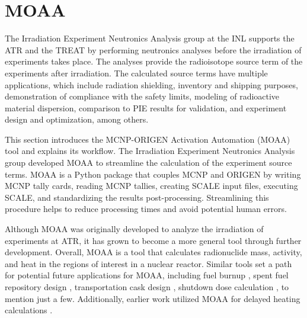 \label{ch:delayedheat}

\section{MOAA}

The Irradiation Experiment Neutronics Analysis group at the \gls*{INL} supports the \gls*{ATR} and the \gls*{TREAT} by performing neutronics analyses before the irradiation of experiments takes place.
The analyses provide the radioisotope source term of the experiments after irradiation.
The calculated source terms have multiple applications, which include radiation shielding, inventory and shipping purposes, demonstration of compliance with the safety limits, modeling of radioactive material dispersion, comparison to \gls*{PIE} results for validation, and experiment design and optimization, among others.

This section introduces the MCNP-ORIGEN Activation Automation (MOAA) tool and explains its workflow.
The Irradiation Experiment Neutronics Analysis group developed MOAA to streamline the calculation of the experiment source terms.
MOAA is a Python package that couples MCNP \cite{mcnp} and ORIGEN \cite{scale} by writing MCNP tally cards, reading MCNP tallies, creating SCALE input files, executing SCALE, and standardizing the results post-processing.
Streamlining this procedure helps to reduce processing times and avoid potential human errors.

Although MOAA was originally developed to analyze the irradiation of experiments at ATR, it has grown to become a more general tool through further development.
Overall, MOAA is a tool that calculates radionuclide mass, activity, and heat in the regions of interest in a nuclear reactor.
Similar tools set a path for potential future applications for MOAA, including fuel burnup \cite{sterbentz_agr1_2018}, spent fuel repository design \cite{spent_fuel_2008}, transportation cask design \cite{transportation_2016}, shutdown dose calculation \cite{chen_rigorous_2002}, to mention just a few.
Additionally, earlier work utilized MOAA for delayed heating calculations \cite{fairhurst_decay_2022, fairhurst_demonstration_2022, fairhurst_database_2022}.


